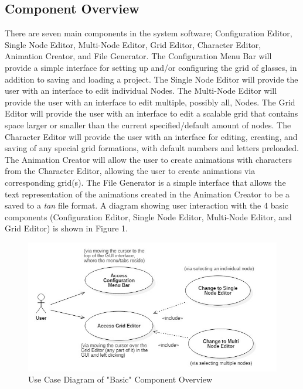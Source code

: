 \documentclass[12pt]{article}
\begin{document}
	\subsection {Component Overview}
  	There are seven main components in the system software; Configuration Editor, Single Node Editor, Multi-Node Editor, Grid Editor, Character Editor, Animation Creator, and File Generator. The Configuration Menu Bar will provide a simple interface for setting up and/or configuring the grid of glasses, in addition to saving and loading a project. The Single Node Editor will provide the user with an interface to edit individual Nodes. The Multi-Node Editor will provide the user with an interface to edit multiple, possibly all, Nodes. The Grid Editor will provide the user with an interface to edit a scalable grid that contains space larger or smaller than the current specified/default amount of nodes. The Character Editor will provide the user with an interface for editing, creating, and saving of any special grid formations, with default numbers and letters preloaded. The Animation Creator will allow the user to create animations with characters from the Character Editor, allowing the user to create animations via corresponding grid(s). The File Generator is a simple interface that allows the text representation of the animations created in the Animation Creator to be a saved to a \textit{tan} file format. A diagram showing user interaction with the 4 basic components (Configuration Editor, Single Node Editor, Multi-Node Editor, and Grid Editor) is shown in Figure 1.	
  	\begin{figure}[ht!]
  		\centering
  		\includegraphics[width=\linewidth]{ComponetOverview.JPG}
  		\caption{Use Case Diagram of "Basic" Component Overview \label{overflow}}
  	\end{figure}
	
  
\end{document}

